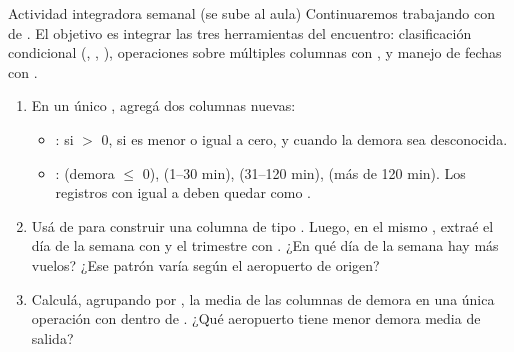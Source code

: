 \documentclass[8pt]{beamer}
\begin{document}
	\begin{frame}[fragile]{Actividad integradora semanal (se sube al aula)}
		Continuaremos trabajando con  de . El objetivo es integrar las tres herramientas del encuentro: clasificación condicional (, , ), operaciones sobre múltiples columnas con , y manejo de fechas con .

		\begin{enumerate}
			\item En un único , agregá dos columnas nuevas:
			\begin{itemize}
				\item {}:  si  $>$ 0,  si es menor o igual a cero, y  cuando la demora sea desconocida.
				\item {}:  (demora $\leq$ 0),  (1--30 min),  (31--120 min),  (más de 120 min). Los registros con  igual a  deben quedar como .
			\end{itemize}

			\item Usá  de  para construir una columna  de tipo . Luego, en el mismo , extraé el día de la semana con  y el trimestre con . ¿En qué día de la semana hay más vuelos? ¿Ese patrón varía según el aeropuerto de origen?

			\item Calculá, agrupando por , la media de las columnas de demora en una única operación con  dentro de . ¿Qué aeropuerto tiene menor demora media de salida?
		\end{enumerate}
	\end{frame}
\end{document}
